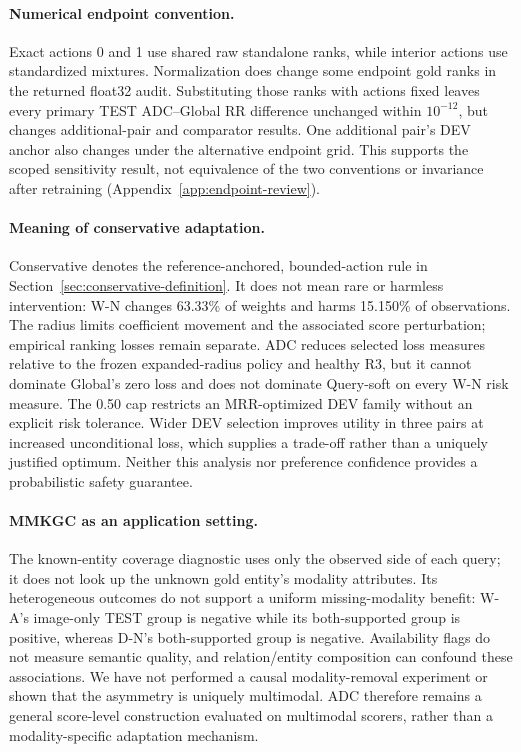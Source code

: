 \documentclass[11pt,a4paper]{article}
\begin{document}
\paragraph{Numerical endpoint convention.}
Exact actions 0 and 1 use shared raw standalone ranks, while interior actions use standardized mixtures. Normalization does change some endpoint gold ranks in the returned float32 audit. Substituting those ranks with actions fixed leaves every primary TEST ADC--Global RR difference unchanged within $10^{-12}$, but changes additional-pair and comparator results. One additional pair's DEV anchor also changes under the alternative endpoint grid. This supports the scoped sensitivity result, not equivalence of the two conventions or invariance after retraining (Appendix~\ref{app:endpoint-review}).

\paragraph{Meaning of conservative adaptation.}
Conservative denotes the reference-anchored, bounded-action rule in Section~\ref{sec:conservative-definition}. It does not mean rare or harmless intervention: W-N changes 63.33\% of weights and harms 15.150\% of observations. The radius limits coefficient movement and the associated score perturbation; empirical ranking losses remain separate. ADC reduces selected loss measures relative to the frozen expanded-radius policy and healthy R3, but it cannot dominate Global's zero loss and does not dominate Query-soft on every W-N risk measure. The 0.50 cap restricts an MRR-optimized DEV family without an explicit risk tolerance. Wider DEV selection improves utility in three pairs at increased unconditional loss, which supplies a trade-off rather than a uniquely justified optimum. Neither this analysis nor preference confidence provides a probabilistic safety guarantee.

\paragraph{MMKGC as an application setting.}
The known-entity coverage diagnostic uses only the observed side of each query; it does not look up the unknown gold entity's modality attributes. Its heterogeneous outcomes do not support a uniform missing-modality benefit: W-A's image-only TEST group is negative while its both-supported group is positive, whereas D-N's both-supported group is negative. Availability flags do not measure semantic quality, and relation/entity composition can confound these associations. We have not performed a causal modality-removal experiment or shown that the asymmetry is uniquely multimodal. ADC therefore remains a general score-level construction evaluated on multimodal scorers, rather than a modality-specific adaptation mechanism.
\end{document}
